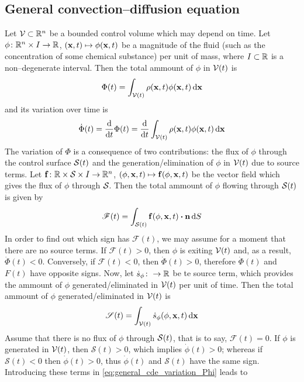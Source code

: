 
\subsection{General convection--diffusion equation}

Let $\mathcal{V}_{} \subset \mathbb{R}^n$ be a bounded control volume which may depend on time. Let $\phi \colon \mathbb{R}^n \times I \to \mathbb{R}$, $(\vb{x}, t) \mapsto \phi(\vb{x}, t)$ be a magnitude of the fluid (such as the concentration of some chemical substance) per unit of mass, where $I \subset \mathbb{R}$ is a non--degenerate interval. Then the total ammount of $\phi$ in ${\mathcal{V}(t)}$ is
\begin{equation}
	\Phi(t) = 
	\int_{{\mathcal{V}(t)}} \rho(\vb{x}, t) \phi(\vb{x}, t) \dd{\vb{x}}
\end{equation}
and its variation over time is
\begin{equation} \label{eq:general_cde_variation_Phi}
	\dot{\Phi}(t) =
	\frac{\dd}{\dd t} \Phi(t) = 
	\frac{\dd}{\dd{t}} \int_{{\mathcal{V}(t)}} \rho(\vb{x}, t) \phi(\vb{x}, t) \dd{\vb{x}}
\end{equation}
The variation of $\Phi$ is a consequence of two contributions: the flux of $\phi$ through the control surface ${\mathcal{S}(t)}$ and the generation/elimination of $\phi$ in ${\mathcal{V}(t)}$ due to source terms. Let $\vb{f} \colon \mathbb{R} \times \mathcal{S}_{} \times I \rightarrow \mathbb{R}^n$, $(\phi, \vb{x}, t) \mapsto \vb{f}(\phi, \vb{x}, t)$ be the vector field which gives the flux of $\phi$ through $\mathcal{S}_{}$. Then the total ammount of $\phi$ flowing through ${\mathcal{S}(t)}$ is given by
\begin{equation}
	\mathscr{F}(t) = \int_{\cst} \vb{f}(\phi, \vb{x}, t) \vdot \vb{n} \dd{S}
\end{equation}
In order to find out which sign has $\mathscr{F}(t)$, we may assume for a moment that there are no source terms. If $\mathscr{F}(t) > 0$, then $\phi$ is exiting ${\mathcal{V}(t)}$ and, as a result, $\dot{\Phi}(t) < 0$. Conversely, if $\mathscr{F}(t) < 0$, then $\dot{\Phi}(t) > 0$, therefore $\dot{\Phi}(t)$ and $F(t)$ have opposite signs. Now, let $\dot{s}_\phi \colon \rightarrow \mathbb{R}$ be te source term, which provides the ammount of $\phi$ generated/eliminated in ${\mathcal{V}(t)}$ per unit of time. Then the total ammount of $\phi$ generated/eliminated in ${\mathcal{V}(t)}$ is
\begin{equation}
	\mathscr{S}(t) = \int_{{\mathcal{V}(t)}} \dot{s}_\phi (\phi, \vb{x}, t) \dd{\vb{x}}
\end{equation}
Assume that there is no flux of $\phi$ through ${\mathcal{S}(t)}$, that is to say, $\mathscr{F}(t) = 0$. If $\phi$ is generated in ${\mathcal{V}(t)}$, then $\mathscr{S}(t) > 0$, which implies $\dot{\phi}(t) > 0$; whereas if $\mathscr{S}(t) < 0$ then $\dot{\phi}(t) > 0$, thus $\dot{\phi}(t)$ and $\mathscr{S}(t)$ have the same sign. Introducing these terms in \eqref{eq:general_cde_variation_Phi} leads to
